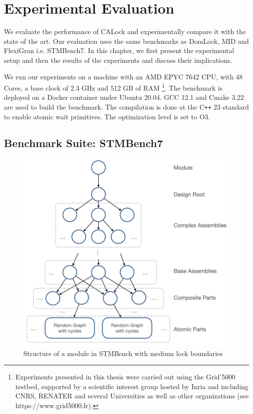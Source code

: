 


\chapter{Experimental Evaluation} \label{chap:evaluation}

\minitoc

We evaluate the performance of CALock and experimentally compare it with the state of the art. Our evaluation uses the same benchmarks as DomLock, MID and FlexiGran \cite{kalikar2016domlock,anjuMID,FlexiGran2024} i.e. STMBench7\cite{guerraoui2006stmbench7}. In this chapter, we first present the experimental setup and then the results of the experiments and discuss their implications. 

We run our experiments on a machine with an AMD EPYC 7642 CPU, with 48 Cores, a base clock of 2.3 GHz and 512 GB of RAM \footnote{Experiments presented in this thesis were carried out using the Grid'5000 testbed, supported by a scientific interest group hosted by Inria and including CNRS, RENATER and several Universities as well as other organizations (see https://www.grid5000.fr).}. 
The benchmark is deployed on a Docker container under Ubuntu 20.04. 
GCC 12.1 and Cmake 3.22 are used to build the benchmark. The compilation is done at the C\texttt{++} 23 standard to enable atomic wait primitives. The optimization level is set to O3.




\section{Benchmark Suite: STMBench7}
	
	
	\begin{figure}
		\centering
		\captionsetup{justification=centering}
		\includegraphics[width=.8\columnwidth]{figures/stmbenchModule}
		\caption{Structure of a module in STMBench with medium lock boundaries}
		\label{stmbenchModule}
	\end{figure}

